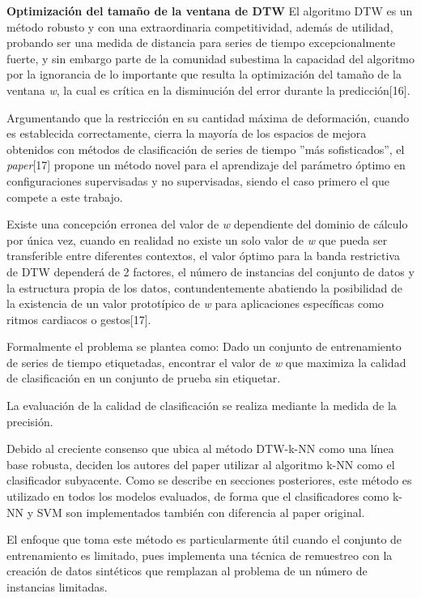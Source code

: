 \hfill\break
\justifying
\textbf{Optimización del tamaño de la ventana de DTW}
	\hfill\break
	\justifying
	El algoritmo DTW es un método robusto y con una extraordinaria competitividad, además de utilidad, probando ser una medida de distancia para series de tiempo excepcionalmente fuerte, y sin embargo parte de la comunidad subestima la capacidad del algoritmo por la ignorancia de lo importante que resulta la optimización del tamaño de la ventana \textit{w}, la cual es crítica en la disminución del error durante la predicción[16].
	
	\hfill\break
	\justifying
	Argumentando que la restricción en su cantidad máxima de deformación, cuando es establecida correctamente, cierra la mayoría de los espacios de mejora obtenidos con métodos de clasificación de series de tiempo ''más sofisticados'', el \textit{paper}[17] propone un método novel para el aprendizaje del parámetro óptimo en configuraciones supervisadas y no supervisadas, siendo el caso primero el que compete a este trabajo.
	
	\hfill\break
	\justifying
	Existe una concepción erronea del valor de \textit{w} dependiente del dominio de cálculo por única vez, cuando en realidad no existe un solo valor de \textit{w} que pueda ser transferible entre diferentes contextos, el valor óptimo para la banda restrictiva de DTW dependerá de 2 factores, el número de instancias del conjunto de datos y la estructura propia de los datos, contundentemente abatiendo la posibilidad de la existencia de un valor prototípico de \textit{w} para aplicaciones específicas como ritmos cardiacos o gestos[17].
	
	\hfill\break
	\justifying
	Formalmente el problema se plantea como: Dado un conjunto de entrenamiento de series de tiempo etiquetadas, encontrar el valor de \textit{w} que maximiza la calidad de clasificación en un conjunto de prueba sin etiquetar.
	
	\hfill\break
	\justifying
	La evaluación de la calidad de clasificación se realiza mediante la medida de la precisión.
	
	\hfill\break
	\justifying
	Debido al creciente consenso que ubica al método DTW-k-NN como una línea base robusta, deciden los autores del paper utilizar al algoritmo k-NN como el clasificador subyacente. Como se describe en secciones posteriores, este método es utilizado en todos los modelos evaluados, de forma que el clasificadores como k-NN y SVM son implementados también con diferencia al paper original.
	
	\hfill\break
	\justifying
	El enfoque que toma este método es particularmente útil cuando el conjunto de entrenamiento es limitado, pues implementa una técnica de remuestreo con la creación de datos sintéticos que remplazan al problema de un número de instancias limitadas.
	
